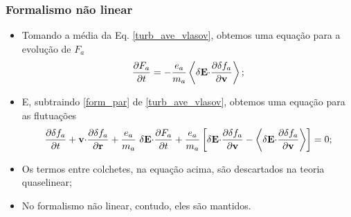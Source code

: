 \documentclass[10pt,aspectratio=1610,lualatex]{beamer}
\begin{document}
\begin{frame}
  \frametitle{Formalismo não linear}
  \begin{itemize}
    \item Tomando a média da Eq. \eqref{turb_ave_vlasov}, obtemos uma
    equação para a evolução de $F_a$
    \begin{equation}
      \frac{\partial F_a}{\partial t}
      =-\frac{e_a}{m_a}\left< \delta {\bf E \cdot}
      \frac{\partial \delta f_a}{\partial \bf v}\right>;
      \label{form_par}
    \end{equation}
    \vspace{-0.2cm}
    \pause 
    \item E, subtraindo \eqref{form_par} de \eqref{turb_ave_vlasov},
    obtemos uma equação para as flutuações
    \begin{equation}
      \frac{\partial \delta f_a}{\partial t}
      +{\bf v \cdot } \frac{\partial \delta f_a}{\partial {\bf r}}
      +\frac{e_a}{m_a}\ \delta {\bf E \cdot}
      \frac{\partial F_a}{\partial t}
      +\frac{e_a}{m_a}\left[\delta {\bf E \cdot}
      \frac{\partial \delta f_a}{\partial \bf v}
      -\left< \delta {\bf E \cdot}
      \frac{\partial \delta f_a}{\partial \bf v}\right>\right]=0;
      \label{flut}
    \end{equation}
    \vspace{-0.2cm}
    \pause
    \item Os termos entre colchetes, na equação acima, são descartados
    na teoria quaselinear;
    \pause
    \vspace{0.4cm}
    \item No formalismo não linear, contudo, eles são mantidos.
  \end{itemize}
\end{frame}
\end{document}
